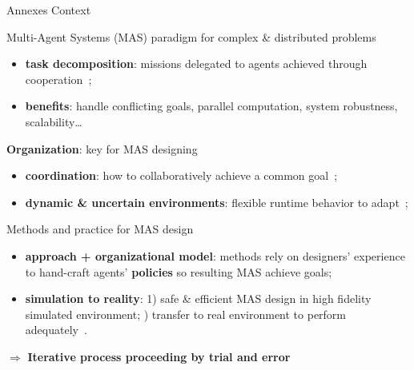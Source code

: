 \begin{frame}{Annexes}
    {Context}

    \begin{block}{Multi-Agent Systems (MAS) paradigm for complex \& distributed problems}
        \begin{itemize}
            \item \textbf{task decomposition}: missions delegated to agents achieved through cooperation~\parencite{Raileanu2023};
            \item \textbf{benefits}: handle conflicting goals, parallel computation, system robustness, scalability\dots
        \end{itemize}
    \end{block}

    \begin{block}{\textbf{Organization}: key for MAS designing}
        \begin{itemize}
            \item \textbf{coordination}: how to collaboratively achieve a common goal~\parencite{Hubner2007};
            \item \textbf{dynamic \& uncertain environments}: flexible runtime behavior to adapt~\parencite{Kathleen2020};
        \end{itemize}
    \end{block}

    \begin{block}{Methods and practice for MAS design}
        \begin{itemize}
            \item \textbf{approach + organizational model}: methods rely on designers' experience to hand-craft agents' \textbf{policies} so resulting MAS achieve goals;
            \item \textbf{simulation to reality}: 1) safe \& efficient MAS design in high fidelity simulated environment; ) transfer to real environment to perform adequately~\parencite{Schon2021}.
        \end{itemize}
        \quad $\Longrightarrow$ \textbf{Iterative process proceeding by trial and error}

    \end{block}

\end{frame}

